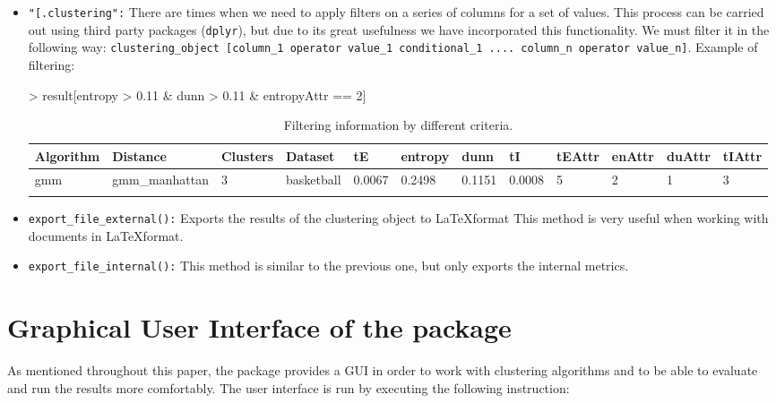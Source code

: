 \begin{itemize}
  \item \texttt{"[.clustering":} There are times when we need to apply filters on a series of columns for a set of values. This process can be carried out using third party packages (\texttt{dplyr}), but due to its great usefulness we have incorporated this functionality. We must filter it in the following way: \texttt{clustering\_object [column\_1 operator value\_1 conditional\_1 .... column\_n operator value\_n]}. Example of filtering:
  \begin{Schunk}
\begin{Sinput}
> result[entropy > 0.11 & dunn > 0.11 & entropyAttr == 2]
\end{Sinput}
\end{Schunk}
{\small
\begin{longtable}{| p{1cm} | p{1.8cm} | p{0.7cm} | p{0.9cm} | p{0.5cm} | p{0.65cm} | p{0.5cm} | p{0.5cm} | p{0.55cm} | p{0.55cm} | p{0.6cm} | p{0.5cm} |}
\hline
\scriptsize  Algorithm & \scriptsize  Distance  &  \scriptsize Clusters & \scriptsize  Dataset & \scriptsize tE & \scriptsize entropy & \scriptsize  dunn  & \scriptsize tI & \scriptsize tEAttr & \scriptsize enAttr & \scriptsize duAttr & \scriptsize tIAttr  \\
\hline
\scriptsize    gmm     & \scriptsize  gmm\_manhattan & \scriptsize      3  & \scriptsize   basketball  & \scriptsize   0.0067  & \scriptsize  0.2498  & \scriptsize 0.1151  & \scriptsize    0.0008     & \scriptsize     5       & \scriptsize       2    & \scriptsize      1      & \scriptsize      3 \\
\hline
\caption{Filtering information by different criteria.}
\label{tab:filtering}
\end{longtable}}

  \item \texttt{export\_file\_external():} Exports the results of the clustering object to \LaTeX format This method is very useful when working with documents in \LaTeX format.
  \item \texttt{export\_file\_internal():} This method is similar to the previous one, but only exports the internal metrics.
\end{itemize}


\section{Graphical User Interface of the  package}

As mentioned throughout this paper, the  package provides a GUI in order to work with clustering algorithms and to be able to evaluate and run the results more comfortably. The user interface is run by executing the following instruction:

